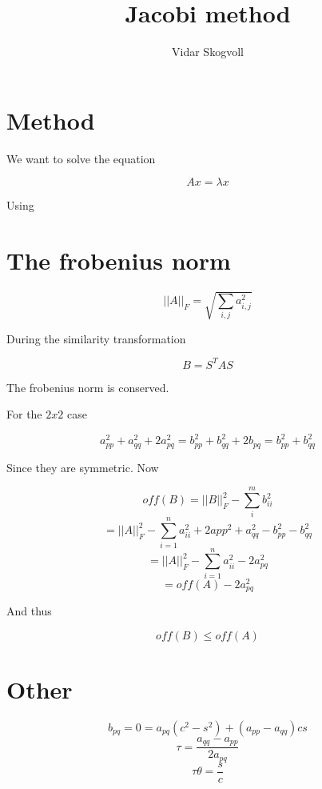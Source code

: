 \documentclass[a4paper,10pt,english]{article}
\title{Jacobi method}
\author{Vidar Skogvoll}
\numberwithin{figure}{section}
\numberwithin{table}{section}
\numberwithin{equation}{section}
\newcommand{\eqs}{\begin{equation}}
\newcommand{\eqf}{\end{equation}}
\begin{document}
\pagestyle{fancy}
\renewcommand{\sectionmark}[1]{\markright{#1}{}}

\pagestyle{fancy}
\renewcommand{\sectionmark}[1]{\markright{\thesection\ #1}}

\fancyhf{}
\lhead{\fancyplain{}{\rightmark }} %
\cfoot{\fancyplain{}{\thepage}}

\maketitle


\section{Method}

We want to solve the equation 

\eqs A x  = \lambda x \eqf

Using 

\section{The frobenius norm}

\eqs || A ||_F = \sqrt{\sum_{i,j}a_{i,j}^2} \eqf

During the similarity transformation 

\eqs B = S^T A S \eqf

The frobenius norm is conserved.

For the $2x2$ case

\eqs a_{pp}^2 + a_{qq}^2 + 2a_{pq}^2 = b_{pp}^2 + b_{qq}^2 + 2 b_{pq} = b_{pp}^2 + b_{qq}^2 \eqf

Since they are symmetric. Now

\eqs off(B) = ||B||_F^2 - \sum_i^m b_{ii}^2 \eqf
\eqs = ||A||_F^2 - \sum_{i=1}^n a_{ii}^2 + 2 a{pp}^2 + a_{qq}^2 - b_{pp}^2 -b_{qq}^2
\eqf
\eqs = ||A||_F^2 - \sum_{i=1}^n a_{ii}^2 - 2 a_{pq}^2 \eqf
\eqs = off(A) - 2 a_{pq}^2 \eqf

And thus 

\eqs off(B) \leq off(A) \eqf

\section{Other}

\eqs b_{pq} = 0 = a_{pq}(c^2 - s^2) + (a_{pp} - a_{qq}) cs \eqf
\eqs \tau = \frac{a_{qq} - a_{pp}}{2a_{pq}} \eqf
\eqs \tau \theta = \frac{s}{c} \eqf
\end{document}
